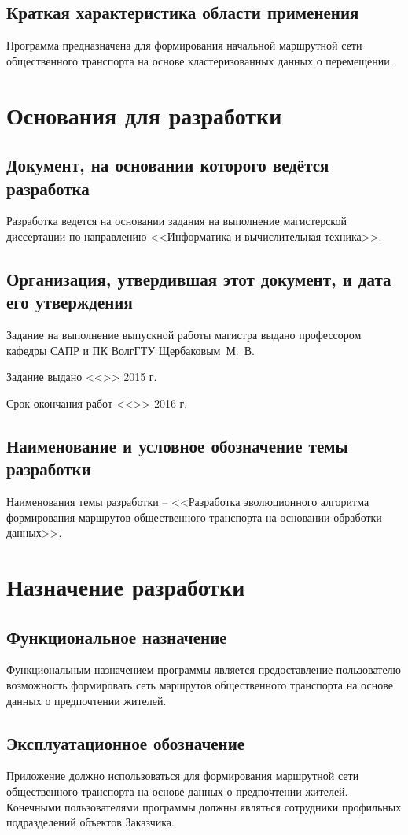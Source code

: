 \section{Краткая характеристика области применения}
Программа предназначена для формирования начальной маршрутной сети общественного транспорта на основе 
кластеризованных данных о перемещении.

\chapter{Основания для разработки}
\section{Документ, на основании которого ведётся разработка}
Разработка ведется на основании задания на выполнение магистерской диссертации по направлению 
<<Информатика и вычислительная техника>>.

\section{Организация, утвердившая этот документ, и дата его утверждения}
Задание на выполнение выпускной работы магистра выдано профессором кафедры САПР и ПК ВолгГТУ Щербаковым~М.~В.

Задание выдано <<\LINE{1cm}>> \LINE{5cm} 2015 г.

Срок окончания работ <<\LINE{1cm}>> \LINE{5cm} 2016 г.

\section{Наименование и условное обозначение темы разработки}
Наименования темы разработки -- <<Разработка эволюционного алгоритма формирования маршрутов общественного 
транспорта на основании обработки данных>>.

\chapter{Назначение разработки}
\section{Функциональное назначение}
Функциональным назначением программы является предоставление пользователю возможность формировать сеть 
маршрутов общественного транспорта на основе данных о предпочтении жителей.

\section{Эксплуатационное обозначение}
Приложение должно использоваться для формирования маршрутной сети общественного транспорта на основе данных 
о предпочтении жителей. Конечными пользователями программы должны являться сотрудники профильных 
подразделений объектов Заказчика.

